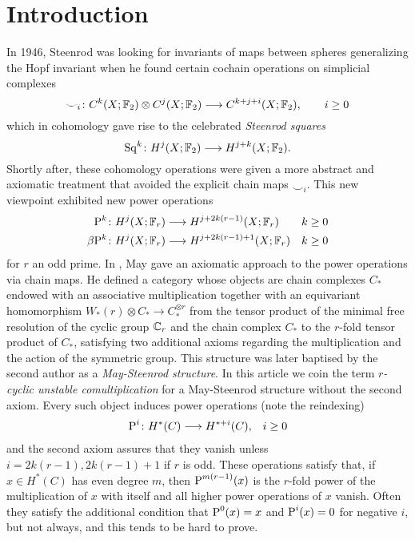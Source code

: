 
\section{Introduction} \label{s:introduction}

In 1946, Steenrod was looking for invariants of maps between spheres generalizing the Hopf invariant when he found certain cochain operations on simplicial complexes
\[\smile_i\colon C^k(X;\mathbb{F}_2)\otimes C^j(X;\mathbb{F}_2)\longrightarrow C^{k+j+i}(X;\mathbb{F}_2),\qquad i\geq 0\]
which in cohomology gave rise to the celebrated \emph{Steenrod squares}
\[\operatorname{Sq}^{k}\colon H^j(X;\mathbb{F}_2)\longrightarrow H^{j+k}(X;\mathbb{F}_2).\]
Shortly after, these cohomology operations were given a more abstract and axiomatic treatment that avoided the explicit chain maps $\smile_i$. This new viewpoint exhibited new power operations
\begin{align*}
	\mathrm{P}^{k}\colon H^j(X;\mathbb{F}_r)&\longrightarrow H^{j+2k(r-1)}(X;\mathbb{F}_r) & k\geq 0 \\
	\beta \mathrm{P}^k\colon H^j(X;\mathbb{F}_r)&\longrightarrow H^{j+2k(r-1)+1}(X;\mathbb{F}_r) & k\geq 0
\end{align*}
for $r$ an odd prime. In \cite{may1970general}, May gave an axiomatic approach to the power operations via chain maps. He defined a category whose objects are chain complexes $C_*$ endowed with an associative multiplication together with an equivariant homomorphism $W_*(r)\otimes C_*\to C_*^{\otimes r}$ from the tensor product of the minimal free resolution of the cyclic group $\mathbb{C}_r$ and the chain complex $C_*$ to the $r$-fold tensor product of $C_*$, satisfying two additional axioms regarding the multiplication and the action of the symmetric group. This structure was later baptised by the second author as a \emph{May-Steenrod structure}. In this article we coin the term \emph{$r$-cyclic unstable comultiplication} for a May-Steenrod structure without the second axiom. Every such object induces power operations (note the reindexing)
\begin{align*}
	\operatorname{P}^i\colon H^*(C)&\longrightarrow H^{*+i}(C), & i\geq 0
\end{align*}
and the second axiom assures that they vanish unless $i = 2k(r-1), 2k(r-1)+1$ if $r$ is odd. These operations satisfy that, if $x\in H^*(C)$ has even degree $m$, then $\operatorname{P}^{m(r-1)}(x)$ is the $r$-fold power of the multiplication of $x$ with itself and all higher power operations of $x$ vanish. Often they satisfy the additional condition that $\operatorname{P}^0(x) = x$ and $\operatorname{P}^i(x) = 0$ for negative $i$, but not always, and this tends to be hard to prove.

